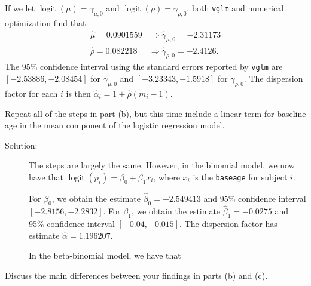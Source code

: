 \documentclass[11pt, letterpaper]{article}
\begin{document}
\begin{enumerate}[(a)]
\begin{description}
  If we let $\operatorname{logit}\left(\mu\right) = \gamma_{\mu,0}$ and
  $\operatorname{logit}\left(\rho\right) = \gamma_{\rho,0}$, both \texttt{vglm}
  and numerical optimization find that
  \begin{align*}
    \hat{\mu} = 0.0901559 &\Rightarrow \hat{\gamma}_{\mu,0} = -2.31173 \\
    \hat{\rho} = 0.082218 &\Rightarrow \hat{\gamma}_{\rho,0} = -2.4126.
  \end{align*}
  The 95\% confidence interval using the standard errors reported by
  \texttt{vglm} are $\left[-2.53886, -2.08454\right]$ for $\gamma_{\mu,0}$ and
  $\left[-3.23343, -1.5918\right]$ for $\gamma_{\rho,0}$. The dispersion factor
  for each $i$ is then $\hat{\alpha}_i = 1 + \hat{\rho}\left(m_i - 1\right)$.
\end{description}
{\em \item Repeat all of the steps in part (b), but this time include a linear term for baseline age 
  in the mean component of the logistic regression model.}

\begin{description}
\item[Solution:] The steps are largely the same. However, in the binomial model,
  we now have that $\operatorname{logit}\left(p_i\right) = \beta_0 + \beta_1x_i$, where $x_i$ is the
  \texttt{baseage} for subject $i$.

  For $\beta_0$, we obtain the estimate $\hat{\beta}_0 = -2.549413$ and 95\%
  confidence interval $\left[-2.8156, -2.2832\right]$. For $\beta_1$, we obtain
  the estimate $\hat{\beta}_1 = -0.0275$ and 95\% confidence interval
  $\left[-0.04, -0.015\right]$. The dispersion factor has estimate
  $\hat{\alpha} = 1.196207$.

  In the beta-binomial model, we have that
\end{description}

{\em \item Discuss the main differences between your findings in parts (b) and (c).}
\end{enumerate}
\end{document}
